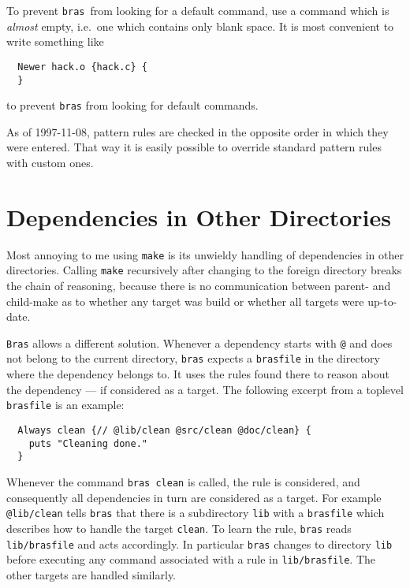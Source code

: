\documentclass[12pt]{article}
\newcommand{\bras}{\texttt{bras}}
\newcommand{\Bras}{\texttt{Bras}}
\newcommand{\make}{\texttt{make}}
\begin{document}
To prevent \bras\ from looking for a default command, use a command
which is \textit{almost} empty, i.e.\ one which contains only blank
space. It is most convenient to write something like
\begin{verbatim}
  Newer hack.o {hack.c} {
  }
\end{verbatim}
to prevent \bras{} from looking for default commands.

As of 1997-11-08, pattern rules are checked in the opposite order in
which they were entered. That way it is easily possible to override
standard pattern rules with custom ones.
\section{Dependencies in Other Directories}

Most annoying to me using \make{} is its unwieldy handling of
dependencies in other directories. Calling \make{}
recursively after changing to the foreign directory
breaks the chain of reasoning, because there is no communication
between parent- and child-make as to whether any target was build or
whether all targets were up-to-date.

\Bras{} allows a different solution. Whenever a dependency starts with
\texttt{@} and does not belong to the current directory, \bras{} expects
a \texttt{brasfile} in the directory where the dependency belongs
to. It uses the rules found there to reason about the dependency ---
if considered as a target.  The following excerpt from a
toplevel \texttt{brasfile} is an example:

\begin{verbatim}
  Always clean {// @lib/clean @src/clean @doc/clean} {
    puts "Cleaning done."
  }
\end{verbatim}

Whenever the command \texttt{bras clean}
is called, the rule is considered, and consequently all
dependencies in turn are considered as a target. For example
\texttt{@lib/clean} tells \bras{} that there is a subdirectory
\texttt{lib} with a \texttt{brasfile} which
describes how to handle the target \texttt{clean}. To learn
the rule, \bras{} reads \texttt{lib/brasfile} and acts accordingly.
In particular \bras{} changes to directory \texttt{lib}
before executing any command associated with a rule in
\texttt{lib/brasfile}. The other targets are handled similarly.


\end{document}
